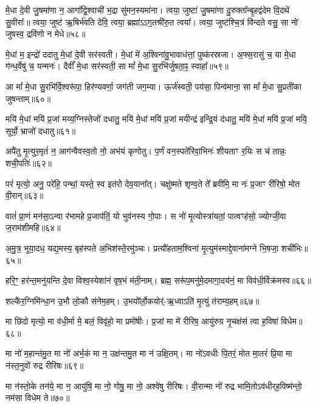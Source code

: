 मे॒धा दे॒वी जु॒षमा॑णा न॒ आगा᳚द्वि॒श्वाची॑ भ॒द्रा सु॑मन॒स्यमा॑ना। 
त्वया॒ जुष्टा॑ जु॒षमा॑णा दु॒रुक्ता᳚न्बृ॒हद्व॑देम वि॒दथे॑ सु॒वीराः᳚॥ 
त्वया॒ जुष्ट॑ ऋ॒षिर्भ॑वति देवि॒ त्वया॒ ब्रह्मा॑ऽऽग॒तश्री॑रु॒त त्वया᳚। 
त्वया॒ जुष्ट॑श्चि॒त्रं वि॑न्दते वसु॒ सा नो॑ जुषस्व॒ द्रवि॑णो न मेधे॥५८॥
\anuvakamend


मे॒धां म॒ इन्द्रो॑ ददातु मे॒धां दे॒वी सर॑स्वती। 
मे॒धां मे॑ अ॒श्विना॑वु॒भावाध॑त्तां॒ पुष्क॑रस्रजा। 
अ॒फ्स॒रासु॑ च॒ या मे॒धा ग॑न्ध॒र्वेषु॑ च॒ यन्मनः॑। 
दैवीं᳚ मे॒धा सर॑स्वती॒ सा मां᳚ मे॒धा सु॒रभि॑र्जुषता॒ꣴ॒ स्वाहा᳚॥५९॥
\anuvakamend


आ मां᳚ मे॒धा सु॒रभि॑र्वि॒श्वरू॑पा॒ हिर॑ण्यवर्णा॒ जग॑ती जग॒म्या। 
ऊर्ज॑स्वती॒ पय॑सा॒ पिन्व॑माना॒ सा मां᳚ मे॒धा सु॒प्रती॑का जुषन्ताम्॥६०॥ 
\anuvakamend

मयि॑ मे॒धां मयि॑ प्र॒जां मय्य॒ग्निस्तेजो॑ दधातु॒ मयि॑ मे॒धां मयि॑ प्र॒जां मयीन्द्र॑ इन्द्रि॒यं द॑धातु॒ मयि॑ मे॒धां मयि॑ प्र॒जां मयि॒ सूर्यो॒ भ्राजो॑ दधातु॥६१॥ 
\anuvakamend


अपै॑तु मृ॒त्युर॒मृतं॑ न॒ आग॑न्वैवस्व॒तो नो॒ अभ॑यं कृणोतु। 
प॒र्णं वन॒स्पते॑रिवा॒भिनः॑ शीयताꣳ र॒यिः स च॑ तान्नः॒ शची॒पतिः॑॥६२॥%
\anuvakamend

परं॑ मृत्यो॒ अनु॒ परे॑हि॒ पन्थां॒ यस्ते॒ स्व इत॑रो देव॒याना᳚त्। 
चक्षु॑ष्मते शृण्व॒ते ते᳚ ब्रवीमि॒ मा नः॑ प्र॒जाꣳ री॑रिषो॒ मोत वी॒रान्॥६३॥%
\anuvakamend

वातं॑ प्रा॒णं मन॑सा॒ऽन्वा र॑भामहे प्र॒जाप॑तिं॒ यो भुव॑नस्य गो॒पाः। 
स नो॑ मृ॒त्योस्त्रा॑यतां॒ पात्वꣳह॑सो॒ ज्योग्जी॒वा ज॒राम॑शीमहि॥६४॥
\anuvakamend

अ॒मु॒त्र॒ भूया॒दध॒ यद्य॒मस्य॒ बृह॑स्पते अ॒भिश॑स्ते॒रमु॑ञ्चः। 
प्रत्यौ॑हताम॒श्विना॑ मृ॒त्युम॑स्माद्दे॒वाना॑मग्ने भि॒षजा॒ शची॑भिः॥६५॥
\anuvakamend

हरि॒ꣳ॒ हर॑न्त॒मनु॑यन्ति दे॒वा विश्व॒स्येशा॑नं वृष॒भं म॑ती॒नाम्। 
ब्रह्म॒ सरू॑प॒मनु॑मे॒दमागा॒दय॑नं॒ मा विव॑धी॒र्विक्र॑मस्व॥६६॥
\anuvakamend

शल्कै॑र॒ग्निमि॑न्धा॒न उ॒भौ लो॒कौ स॑नेम॒हम्। 
उ॒भयो᳚र्लो॒कयोर्॑-ऋ॒ध्वाऽति॑ मृ॒त्युं त॑राम्य॒हम्॥६७॥
\anuvakamend

मा छि॑दो मृत्यो॒ मा व॑धी॒र्मा मे॒ बलं॒ विवृ॑हो॒ मा प्रमो॑षीः। 
प्र॒जां मा मे॑ रीरिष॒ आयु॑रुग्र नृ॒चक्ष॑सं त्वा ह॒विषा॑ विधेम॥६८॥
\anuvakamend

मा नो॑ म॒हान्त॑मु॒त मा नो॑ अर्भ॒कं मा न॒ उक्ष॑न्तमु॒त मा न॑ उक्षि॒तम्। 
मा नो॑ऽवधीः पि॒तरं॒ मोत मा॒तरं॑ प्रि॒या मा न॑स्त॒नुवो॑ रुद्र रीरिषः॥६९॥
\anuvakamend

मा न॑स्तो॒के तन॑ये॒ मा न॒ आयु॑षि॒ मा नो॒ गोषु॒ मा नो॒ अश्वे॑षु रीरिषः। 
वी॒रान्मा नो॑ रुद्र भामि॒तोऽव॑धीर्‌ह॒विष्म॑न्तो॒ नम॑सा विधेम ते॥७०॥
\anuvakamend 

